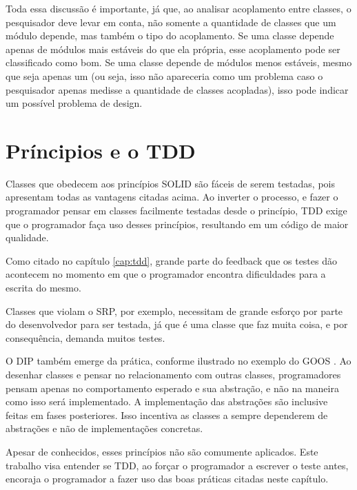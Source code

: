 Toda essa discussão é importante, já que, ao analisar acoplamento entre classes,
o pesquisador deve levar em conta, não somente a quantidade de classes
que um módulo depende, mas também o tipo do acoplamento. Se uma classe depende
apenas de módulos mais estáveis do que ela própria, esse acoplamento pode ser
classificado como bom. Se uma classe depende de módulos menos estáveis, mesmo
que seja apenas um (ou seja, isso não apareceria como um problema caso o
pesquisador apenas medisse a quantidade de classes acopladas), isso pode indicar
um possível problema de design.

\section{Príncipios e o TDD}

Classes que obedecem aos princípios SOLID são fáceis de serem testadas, pois
apresentam todas as vantagens citadas acima. Ao inverter o processo, e fazer o
programador pensar em classes facilmente testadas desde o princípio, TDD exige
que o programador faça uso desses princípios, resultando em um código de maior
qualidade.

Como citado no capítulo \ref{cap:tdd}, grande parte do feedback que os testes
dão acontecem no momento em que o programador encontra dificuldades para a
escrita do mesmo.

Classes que violam o SRP, por exemplo, necessitam de grande
esforço por parte do desenvolvedor para ser testada, já que é uma classe que faz
muita coisa, e por consequência, demanda muitos testes.

O DIP também emerge da prática, conforme ilustrado no exemplo do GOOS
\cite{GOOS}. Ao desenhar classes e pensar no relacionamento com outras classes,
programadores pensam apenas no comportamento esperado e sua abstração, e não na
maneira como isso será implementado. A implementação das abstrações são
inclusive feitas em fases posteriores. Isso incentiva as classes a
sempre dependerem de abstrações e não de implementações concretas.

Apesar de conhecidos, esses princípios não são comumente aplicados.
Este trabalho visa entender se TDD, ao forçar o programador a escrever o teste
antes, encoraja o programador a fazer uso das boas práticas citadas neste
capítulo.
